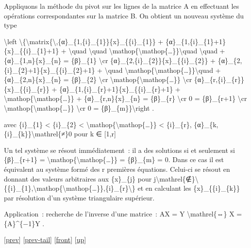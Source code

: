 \documentclass[]{article}
\begin{document}
Appliquons la méthode du pivot sur les lignes de la matrice A en
effectuant les opérations correspondantes sur la matrice B. On obtient
un nouveau système du type

\textbackslash{}left
\textbackslash{}\{\textbackslash{}matrix\{\textbackslash{},\{α\}\_\{1,\{i\}\_\{1\}\}\{x\}\_\{\{i\}\_\{1\}\}
+ \{α\}\_\{1,\{i\}\_\{1\}+1\}\{x\}\_\{\{i\}\_\{1\}+1\} +
\textbackslash{}quad \textbackslash{}quad
\textbackslash{}mathop\{\textbackslash{}mathop\{\ldots{}\}\}\textbackslash{}quad
\textbackslash{}quad + \{α\}\_\{1,n\}\{x\}\_\{n\} = \{β\}\_\{1\}
\textbackslash{}cr \{α\}\_\{2,\{i\}\_\{2\}\}\{x\}\_\{\{i\}\_\{2\}\} +
\{α\}\_\{2,\{i\}\_\{2\}+1\}\{x\}\_\{\{i\}\_\{2\}+1\} +
\textbackslash{}quad
\textbackslash{}mathop\{\textbackslash{}mathop\{\ldots{}\}\}\textbackslash{}quad
+ \{α\}\_\{2,n\}\{x\}\_\{n\} = \{β\}\_\{2\} \textbackslash{}cr
\textbackslash{}mathop\{\textbackslash{}mathop\{\ldots{}\}\}
\textbackslash{}cr \{α\}\_\{r,\{i\}\_\{r\}\}\{x\}\_\{\{i\}\_\{r\}\} +
\{α\}\_\{1,\{i\}\_\{r\}+1\}\{x\}\_\{\{i\}\_\{r\}+1\} +
\textbackslash{}mathop\{\textbackslash{}mathop\{\ldots{}\}\} +
\{α\}\_\{r,n\}\{x\}\_\{n\} = \{β\}\_\{r\} \textbackslash{}cr 0 =
\{β\}\_\{r+1\} \textbackslash{}cr
\textbackslash{}mathop\{\textbackslash{}mathop\{\ldots{}\}\}
\textbackslash{}cr 0 = \{β\}\_\{m\}\}\textbackslash{}right .

avec \{i\}\_\{1\} \textless{} \{i\}\_\{2\} \textless{}
\textbackslash{}mathop\{\textbackslash{}mathop\{\ldots{}\}\} \textless{}
\{i\}\_\{r\}, \{α\}\_\{k,\{i\}\_\{k\}\}\textbackslash{}mathrel\{≠\}0
pour k ∈ {[}1,r{]}

Un tel système se résout immédiatement~: il a des solutions si et
seulement si \{β\}\_\{r+1\} =
\textbackslash{}mathop\{\textbackslash{}mathop\{\ldots{}\}\} =
\{β\}\_\{m\} = 0. Dans ce cas il est équivalent au système formé des r
premières équations. Celui-ci se résout en donnant des valeurs
arbitraires aux \{x\}\_\{j\} pour
j\textbackslash{}mathrel\{∉\}\textbackslash{}\{\{i\}\_\{1\},\textbackslash{}mathop\{\textbackslash{}mathop\{\ldots{}\}\},\{i\}\_\{r\}\textbackslash{}\}
et en calculant les \{x\}\_\{\{i\}\_\{k\}\} par résolution d'un système
triangulaire supérieur.

Application~: recherche de l'inverse d'une matrice~: AX = Y
\textbackslash{}mathrel\{⇔\} X = \{A\}\^{}\{−1\}Y .

{[}\href{coursse13.html}{prev}{]}
{[}\href{coursse13.html\#tailcoursse13.html}{prev-tail}{]}
{[}\href{coursse14.html}{front}{]}
{[}\href{coursch3.html\#coursse14.html}{up}{]}
\end{document}
